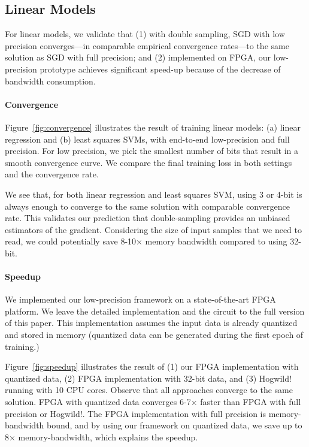 \documentclass{article}
\begin{document}
\vspace{-1em}
\subsection{Linear Models}
\vspace{-0.5em}

For linear models, we validate that (1) 
with double sampling, SGD with low
precision converges---in
comparable empirical 
convergence rates---to the same solution
as SGD with full precision; and
(2) implemented on FPGA, our low-precision
prototype achieves significant speed-up
because of the decrease of bandwidth
consumption.

\vspace{-1em}
\paragraph{Convergence}

Figure~\ref{fig:convergence} illustrates
the result of training linear models:
(a) linear
regression and (b) least squares SVMs,
with end-to-end low-precision and 
full precision. For
low precision, we pick the 
smallest number of bits that
result in a smooth convergence
curve. We compare the final 
training loss in both settings 
and the convergence rate.

We see that, for both linear regression 
and least squares SVM,
using 3 or 4-bit is always enough
to converge to the same solution
with comparable convergence rate. 
This validates our prediction that
double-sampling provides an
unbiased estimators of the gradient.
Considering the size of input
samples that we need to read, we
could potentially save 8-10$\times$ 
memory bandwidth compared to using 
32-bit. 

\vspace{-1em}
\paragraph{Speedup}
We implemented our low-precision 
framework on a state-of-the-art 
FPGA platform. We leave the detailed 
implementation and the circuit to
the full version of this paper. 
This implementation assumes the input
data is already quantized and
stored in memory (quantized
data can be generated during the
first epoch of training.)

Figure~\ref{fig:speedup} illustrates 
the result of (1) our FPGA
implementation with quantized data,
(2) FPGA implementation with 32-bit
data, and (3) Hogwild! running with
10 CPU cores.
Observe that all approaches
converge to the same solution.
FPGA with quantized data converges
6-7$\times$ faster
than FPGA with full precision
or Hogwild!. The FPGA implementation
with full precision is
memory-bandwidth bound, and by using our framework on quantized data, we save 
up to 8$\times$ memory-bandwidth, which
explains the speedup.
\end{document}
